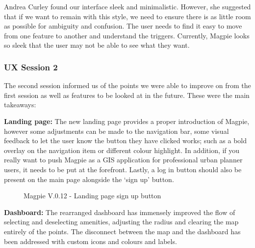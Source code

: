 Andrea Curley found our interface sleek and minimalistic. However,
she suggested that if we want to remain with this style, we need to ensure there
is as little room as possible for ambiguity and confusion. The user needs to
find it easy to move from one feature to another and understand the triggers.
Currently, Magpie looks so sleek that the user may not be able to see what they
want.

\newpage{}

\subsubsection{UX Session 2}
The second session informed us of the points we were able to improve on from the
first session as well as features to be looked at in the future. These were the
main takeaways:

\noindent\textbf{Landing page: }
The new landing page provides a proper introduction of Magpie, however some
adjustments can be made to the navigation bar, some visual feedback to let the
user know the button they have clicked works; such as a bold overlay on the
navigation item or different colour highlight. In addition, if you really want
to push Magpie as a GIS application for professional urban planner users, it
needs to be put at the forefront. Lastly, a log in button should also be present
on the main page alongside the `sign up' button.

\begin{figure}[h!]
    \centering
    \caption{Magpie V.0.12 - Landing page sign up button}
\end{figure}

\textbf{Dashboard: }
The rearranged dashboard has immensely improved the flow of selecting and
deselecting amenities, adjusting the radius and clearing the map entirely of the
points. The disconnect between the map and the dashboard has been addressed with
custom icons and colours and labels.

